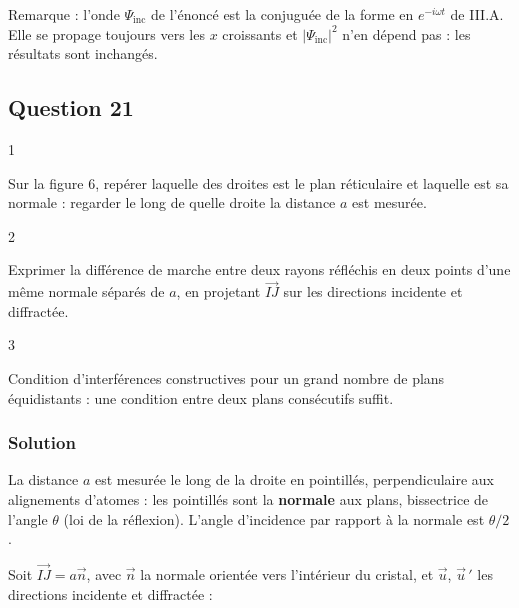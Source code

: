 \documentclass[11pt,a4paper]{article}
\newcommand{\equationajustee}[1]{%
  \sbox{\boiteequation}{$\displaystyle #1$}%
  \ifdim\wd\boiteequation>\linewidth
    \[\resizebox{\linewidth}{!}{\usebox{\boiteequation}}\]%
  \else
    \[#1\]%
  \fi}
\begin{document}
Remarque : l'onde \(\Psi_{\text{inc}}\) de l'énoncé est la conjuguée de la forme en \(e^{-i\omega t}\) de III.A. Elle se propage toujours vers les \(x\) croissants et \(|\Psi_{\text{inc}}|^2\) n'en dépend pas : les résultats sont inchangés.

\hypertarget{question-21}{%
\subsection{Question 21}\label{question-21}}

\begin{indication}{1}

Sur la figure 6, repérer laquelle des droites est le plan réticulaire et laquelle est sa normale : regarder le long de quelle droite la distance \(a\) est mesurée.

\end{indication}

\begin{indication}{2}

Exprimer la différence de marche entre deux rayons réfléchis en deux points d'une même normale séparés de \(a\), en projetant \(\vec{IJ}\) sur les directions incidente et diffractée.

\end{indication}

\begin{indication}{3}

Condition d'interférences constructives pour un grand nombre de plans équidistants : une condition entre deux plans consécutifs suffit.

\end{indication}

\hypertarget{solution-20}{%
\subsubsection{Solution}\label{solution-20}}

La distance \(a\) est mesurée le long de la droite en pointillés, perpendiculaire aux alignements d'atomes : les pointillés sont la \textbf{normale} aux plans, bissectrice de l'angle \(\theta\) (loi de la réflexion). L'angle d'incidence par rapport à la normale est \(\theta/2\).

Soit \(\vec{IJ}=a\vec n\), avec \(\vec n\) la normale orientée vers l'intérieur du cristal, et \(\vec u\), \(\vec u\,'\) les directions incidente et diffractée :

\equationajustee{\vec n\cdot\vec u=\cos\frac\theta2}
\end{document}
